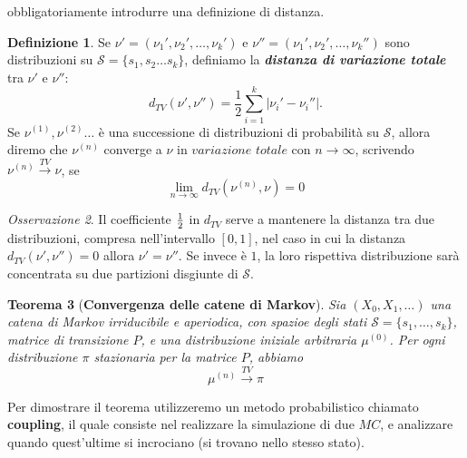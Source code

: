 \documentclass{article}
\newtheorem{theorem}{Teorema}[section]
\theoremstyle{definition}
\theoremstyle{definition}
\newtheorem{definition}[theorem]{Definizione}
\theoremstyle{remark}
\newtheorem{remark}[theorem]{Osservazione}
\begin{document}
obbligatoriamente introdurre una definizione di distanza.
\begin{definition}
    Se $\nu' = (\nu_1',\nu_2',\dots,\nu_k')$ e $\nu'' =(\nu_1',\nu_2',\dots,\nu_k'')$ sono distribuzioni su $\mathcal{S} = \{s_1,s_2\dots s_k\}$, definiamo la \textbf{\textit{distanza di variazione totale}} tra $\nu'$ e $\nu''$:
    $$d_{TV}(\nu',\nu'') = \frac{1}{2}\sum_{i=1}^k|\nu_i'-\nu_i''|.$$
    Se $\nu^{(1)},\nu^{(2)}\dots$ è una successione di distribuzioni di probabilità su $\mathcal{S}$, allora diremo che  $\nu^{(n)}$
    converge a $\nu$ in $variazione$ $totale$ con $n\to \infty$, scrivendo $\nu^{(n)}\xrightarrow{TV}\nu$, se
    $$\lim_{n\to\infty} d_{TV}(\nu^{(n)},\nu) = 0$$
\end{definition}
\begin{remark}
    Il coefficiente $1\over 2$ in $d_{TV}$ serve a mantenere la distanza tra due distribuzioni, compresa nell'intervallo $[0,1]$, nel caso in cui la distanza $d_{TV}(\nu',\nu'')=0$ allora $\nu' = \nu''$. Se invece è $1$, la loro rispettiva distribuzione sarà concentrata su due
    partizioni disgiunte di $\mathcal{S}$.
\end{remark}
\begin{theorem}[\textbf{Convergenza delle catene di Markov}] Sia $(X_0,X_1,\dots)$ una catena di Markov irriducibile e aperiodica, con spazioe degli stati $\mathcal{S}=\{s_1,\dots,s_k\}$,
    matrice di transizione $P$, e una distribuzione iniziale arbitraria $\mu^{(0)}$. Per ogni distribuzione $\pi$ stazionaria per la matrice $P$, abbiamo
    $$\mu^{(n)}\xrightarrow{TV}\pi$$

\end{theorem}
Per dimostrare il teorema utilizzeremo un metodo probabilistico chiamato \textbf{coupling}, il quale consiste nel realizzare la simulazione di due $MC$, e analizzare quando quest'ultime si incrociano (si trovano nello stesso stato).
\end{document}
